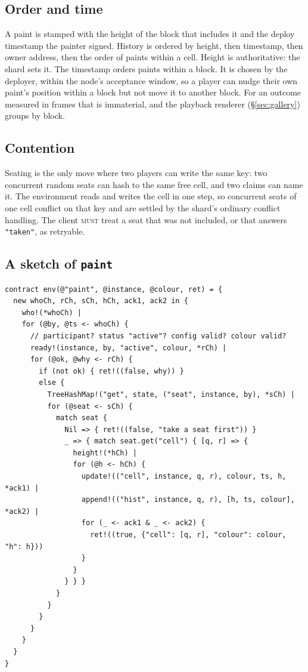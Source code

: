 \documentclass[11pt,a4paper]{article}
\newcommand{\code}[1]{\texttt{#1}}
\newcommand{\MUST}{\textsc{must}}
\begin{document}
\subsection{Order and time}\label{sec:order}

A paint is stamped with the height of the block that includes it and the deploy timestamp the
painter signed. History is ordered by height, then timestamp, then owner address, then
the order of paints within a cell. Height is authoritative: the shard sets it. The timestamp
orders paints within a block. It is chosen by the deployer, within the node's acceptance
window, so a player can nudge their own paint's position within a block but not move it to
another block. For an outcome measured in frames that is immaterial, and the playback
renderer (\S\ref{sec:gallery}) groups by block.

\subsection{Contention}

Seating is the only move where two players can write the same key: two concurrent random seats
can hash to the same free cell, and two claims can name it. The environment reads and writes
the cell in one step, so concurrent seats of one cell conflict on that key and are settled by
the shard's ordinary conflict handling. The client \MUST{} treat a seat that was not included,
or that answers \code{"taken"}, as retryable.

\subsection{A sketch of \code{paint}}

\begin{lstlisting}[language=rholang]
contract env(@"paint", @instance, @colour, ret) = {
  new whoCh, rCh, sCh, hCh, ack1, ack2 in {
    who!(*whoCh) |
    for (@by, @ts <- whoCh) {
      // participant? status "active"? config valid? colour valid?
      ready!(instance, by, "active", colour, *rCh) |
      for (@ok, @why <- rCh) {
        if (not ok) { ret!((false, why)) }
        else {
          TreeHashMap!("get", state, ("seat", instance, by), *sCh) |
          for (@seat <- sCh) {
            match seat {
              Nil => { ret!((false, "take a seat first")) }
              _ => { match seat.get("cell") { [q, r] => {
                height!(*hCh) |
                for (@h <- hCh) {
                  update!(("cell", instance, q, r), colour, ts, h, *ack1) |
                  append!(("hist", instance, q, r), [h, ts, colour], *ack2) |
                  for (_ <- ack1 & _ <- ack2) {
                    ret!((true, {"cell": [q, r], "colour": colour, "h": h}))
                  }
                }
              } } }
            }
          }
        }
      }
    }
  }
}
\end{lstlisting}
\end{document}
